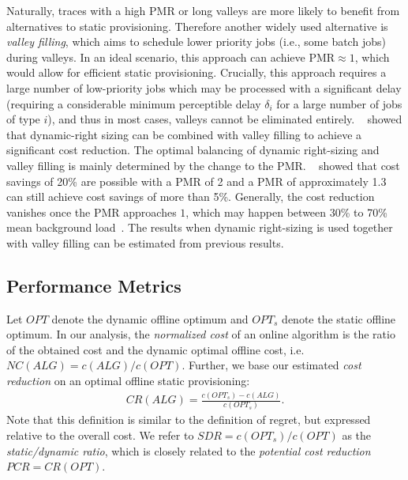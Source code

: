 Naturally, traces with a high PMR or long valleys are more likely to benefit from alternatives to static provisioning. Therefore another widely used alternative is \emph{valley filling}, which aims to schedule lower priority jobs (i.e., some batch jobs) during valleys. In an ideal scenario, this approach can achieve $\text{PMR} \approx 1$, which would allow for efficient static provisioning. Crucially, this approach requires a large number of low-priority jobs which may be processed with a significant delay (requiring a considerable minimum perceptible delay $\delta_i$ for a large number of jobs of type $i$), and thus in most cases, valleys cannot be eliminated entirely. \citeauthor*{Lin2011}~\cite{Lin2011} showed that dynamic-right sizing can be combined with valley filling to achieve a significant cost reduction. The optimal balancing of dynamic right-sizing and valley filling is mainly determined by the change to the PMR. \citeauthor*{Lin2011}~\cite{Lin2011} showed that cost savings of 20\% are possible with a PMR of 2 and a PMR of approximately 1.3 can still achieve cost savings of more than 5\%. Generally, the cost reduction vanishes once the PMR approaches $1$, which may happen between 30\% to 70\% mean background load~\cite{Lin2011}. The results when dynamic right-sizing is used together with valley filling can be estimated from previous results.

\subsection{Performance Metrics}

Let $OPT$ denote the dynamic offline optimum and $OPT_s$ denote the static offline optimum. In our analysis, the \emph{normalized cost} of an online algorithm is the ratio of the obtained cost and the dynamic optimal offline cost, i.e. $NC(ALG) = c(ALG) / c(OPT)$. Further, we base our estimated \emph{cost reduction} on an optimal offline static provisioning: \begin{align*}
    CR(ALG) = \frac{c(OPT_s) - c(ALG)}{c(OPT_s)}.
\end{align*} Note that this definition is similar to the definition of regret, but expressed relative to the overall cost. We refer to $SDR = c(OPT_s) / c(OPT)$ as the \emph{static/dynamic ratio}, which is closely related to the \emph{potential cost reduction} $PCR = CR(OPT)$.

